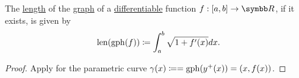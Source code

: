\begin{corollary}\label{thm:length_of_function_graph}
  The \hyperref[def:length_of_parametric_curve]{length} of the \hyperref[def:function/graph]{graph} of a \hyperref[def:differentiability/frechet]{differentiable} function \( f: [a, b] \to \BR \), if it exists, is given by
  \begin{equation*}
    \operatorname{len}(\operatorname{gph}(f)) \coloneqq \int_a^b \sqrt{1 + f'(x)} dx.
  \end{equation*}
\end{corollary}
\begin{proof}
  Apply  for the parametric curve \( \gamma(x) \coloneqq = \operatorname{gph}(y^+(x)) = (x, f(x)) \).
\end{proof}
